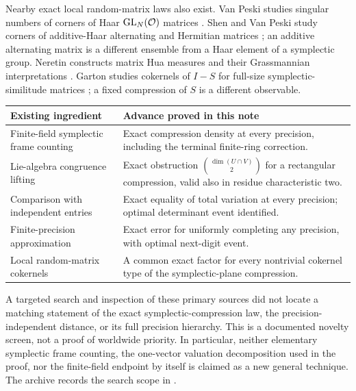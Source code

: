 Nearby exact local random-matrix laws also exist. Van Peski studies
singular numbers of corners of Haar $\mathrm{GL}_N(\mathcal O)$ matrices
\cite{VanPeski2021}. Shen and Van Peski study corners of additive-Haar
alternating and Hermitian matrices \cite{ShenVanPeski2025}; an additive
alternating matrix is a different ensemble from a Haar element of a
symplectic group. Neretin constructs matrix Hua measures and their
Grassmannian interpretations \cite{Neretin2013}. Garton studies
cokernels of $I-S$ for full-size symplectic-similitude matrices
\cite{Garton2015}; a fixed compression of $S$ is a different observable.

\begin{center}
\small
\begin{tabularx}{\textwidth}{@{}p{}>{\raggedright\arraybackslash}X@{}}
\toprule
Existing ingredient & Advance proved in this note \\
\midrule
Finite-field symplectic frame counting & Exact compression density at every
precision, including the terminal finite-ring correction. \\
Lie-algebra congruence lifting & Exact obstruction
$\binom{\dim(U\cap V)}2$ for a rectangular compression, valid also in
residue characteristic two. \\
Comparison with independent entries & Exact equality of total variation
at every precision; optimal determinant event identified. \\
Finite-precision approximation & Exact error for uniformly completing
any precision, with optimal next-digit event. \\
Local random-matrix cokernels & A common exact factor for every nontrivial
cokernel type of the symplectic-plane compression. \\
\bottomrule
\end{tabularx}
\end{center}

A targeted search and inspection of these primary sources did not
locate a matching statement of the exact symplectic-compression law,
the precision-independent distance, or its full precision hierarchy.
This is a documented novelty screen, not a proof of worldwide priority.
In particular, neither elementary symplectic frame counting, the
one-vector valuation decomposition used in the proof, nor the
finite-field endpoint by itself is claimed as a new general technique.
The archive records the search scope in
.
